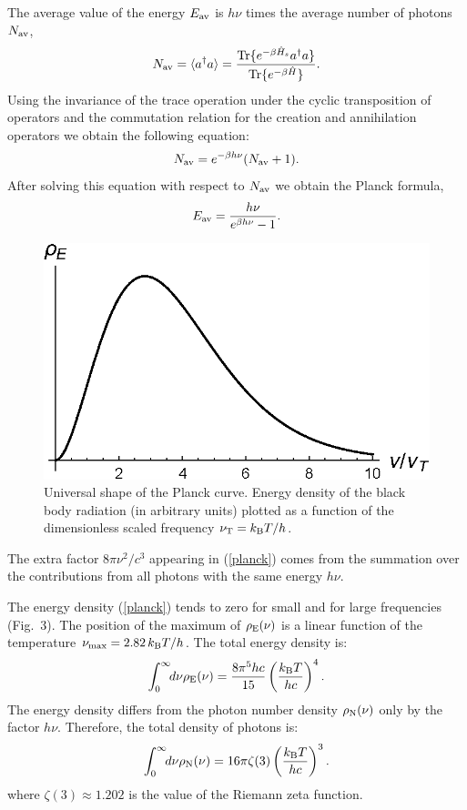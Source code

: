 \documentclass[onecolumn,aps,pra,12pt]{revtex4-1}
\begin{document}
The average value of the energy $E_{\rm av}$ is $h\nu$ times the average number of photons $N_{\rm av}$,
\begin{align}\label{enbb}
N_{\rm av}=\langle a^\dagger a\rangle=\frac{{\rm Tr}\{e^{-\beta\hat{H}_s}a^\dagger a\}}{{\rm Tr}\{e^{-\beta\hat{H}}\}}.
\end{align}
Using the invariance of the trace operation under the cyclic transposition of operators and the commutation relation for the creation and annihilation operators we obtain the following equation:
\begin{align}\label{feq}
N_{\rm av}=e^{-\beta h\nu}(N_{\rm av}+1).
\end{align}
After solving this equation with respect to $N_{\rm av}$ we obtain the Planck formula,
\begin{align}\label{plancks}
E_{\rm av}=\frac{h\nu}{e^{\beta h\nu}-1}.
\end{align}
\begin{figure}
\includegraphics[scale=0.9]{Fig3}
\caption{Universal shape of the Planck curve. Energy density of the black body radiation (in arbitrary units) plotted as a function of the dimensionless scaled frequency $\nu_{\rm T}=k_{\rm B}T/h$.}
\end{figure}
The extra factor $8\pi\nu^2/c^3$ appearing in (\ref{planck}) comes from the summation over the contributions from all photons with the same energy $h\nu$.

The energy density (\ref{planck}) tends to zero for small and for large frequencies (Fig.~3). The position of the maximum of $\rho_{\rm E}(\nu)$ \cite{lambda} is a linear function of the temperature $\nu_{\rm max}=2.82\,k_{\rm B}T/h$. The total energy density is:
\begin{align}\label{tote}
\int_0^\infty\!\!d\nu\rho_{\rm E}(\nu)=\frac{8\pi^5hc}{15}\left(\frac{k_{\rm B}T}{hc}\right)^4.
\end{align}
The energy density differs from the photon number density $\rho_{\rm N}(\nu)$ only by the factor $h\nu$. Therefore, the total density of photons is:
\begin{align}\label{totn}
\int_0^\infty\!\!d\nu\rho_{\rm N}(\nu)=16\pi\zeta(3)\left(\frac{k_{\rm B}T}{hc}\right)^3.
\end{align}
where $\zeta(3)\approx1.202$ is the value of the Riemann zeta function.
\end{document}
